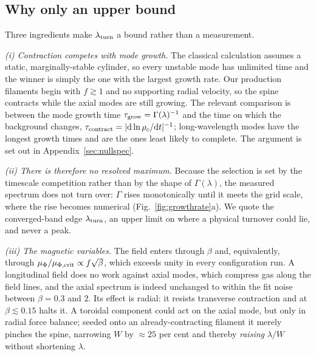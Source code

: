 \documentclass[usenatbib,twoside,twocolumn]{mnras}
\begin{document}
\subsection{Why only an upper bound}
\label{sec:whyupper}

Three ingredients make $\lambda_{\rm turn}$ a bound rather than a measurement.

\emph{(i) Contraction competes with mode growth.} The classical calculation assumes a static, marginally-stable cylinder, so every unstable mode has unlimited time and the winner is simply the one with the largest growth rate. Our production filaments begin with $f\gtrsim1$ and no supporting radial velocity, so the spine contracts while the axial modes are still growing. The relevant comparison is between the mode growth time $\tau_{\rm grow}=\Gamma(\lambda)^{-1}$ and the time on which the background changes, $\tau_{\rm contract}=|{\rm d}\ln\rho_c/{\rm d}t|^{-1}$; long-wavelength modes have the longest growth times and are the ones least likely to complete. The argument is set out in Appendix~\ref{sec:nullspec}.

\emph{(ii) There is therefore no resolved maximum.} Because the selection is set by the timescale competition rather than by the shape of $\Gamma(\lambda)$, the measured spectrum does not turn over: $\Gamma$ rises monotonically until it meets the grid scale, where the rise becomes numerical (Fig.~\ref{fig:growthrate}a). We quote the converged-band edge $\lambda_{\rm turn}$, an upper limit on where a physical turnover could lie, and never a peak.

\emph{(iii) The magnetic variables.} The field enters through $\beta$ and, equivalently, through $\mu_\Phi/\mu_{\Phi,\rm crit}\propto f\sqrt{\beta}$, which exceeds unity in every configuration run. A longitudinal field does no work against axial modes, which compress gas along the field lines, and the axial spectrum is indeed unchanged to within the fit noise between $\beta=0.3$ and $2$. Its effect is radial: it resists transverse contraction and at $\beta\lesssim0.15$ halts it. A toroidal component could act on the axial mode, but only in radial force balance; seeded onto an already-contracting filament it merely pinches the spine, narrowing $W$ by $\approx25$ per cent and thereby \emph{raising} $\lambda/W$ without shortening $\lambda$.
\end{document}
